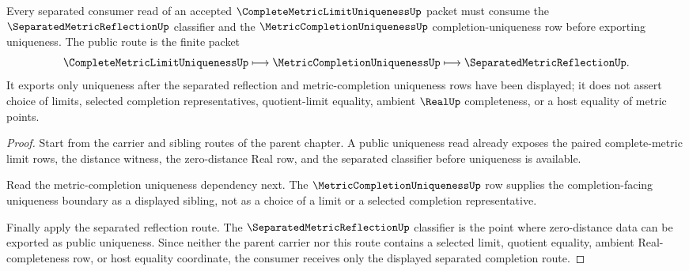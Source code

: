 \begin{theorem}
\label{thm:complete-metric-limit-uniqueness-separated-consumer-route}
Every separated consumer read of an accepted $\CompleteMetricLimitUniquenessUp$ packet must consume the $\SeparatedMetricReflectionUp$ classifier and the $\MetricCompletionUniquenessUp$ completion-uniqueness row before exporting uniqueness. The public route is the finite packet
$$
\CompleteMetricLimitUniquenessUp\longmapsto \MetricCompletionUniquenessUp\longmapsto \SeparatedMetricReflectionUp .
$$
It exports only uniqueness after the separated reflection and metric-completion uniqueness rows have been displayed; it does not assert choice of limits, selected completion representatives, quotient-limit equality, ambient $\RealUp$ completeness, or a host equality of metric points.
\end{theorem}
\begin{proof}
Start from the carrier and sibling routes of the parent chapter. A public uniqueness read already exposes the paired complete-metric limit rows, the distance witness, the zero-distance Real row, and the separated classifier before uniqueness is available.

Read the metric-completion uniqueness dependency next. The $\MetricCompletionUniquenessUp$ row supplies the completion-facing uniqueness boundary as a displayed sibling, not as a choice of a limit or a selected completion representative.

Finally apply the separated reflection route. The $\SeparatedMetricReflectionUp$ classifier is the point where zero-distance data can be exported as public uniqueness. Since neither the parent carrier nor this route contains a selected limit, quotient equality, ambient Real-completeness row, or host equality coordinate, the consumer receives only the displayed separated completion route.
\end{proof}
